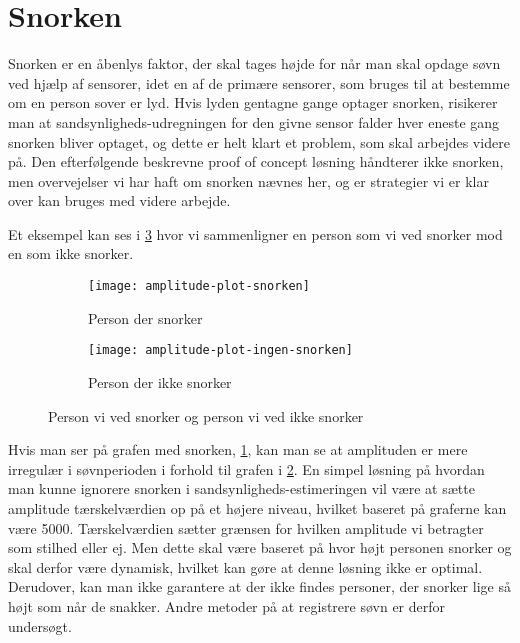 \section{Snorken}\label{section:snorken}
Snorken er en åbenlys faktor, der skal tages højde for når man skal opdage søvn ved hjælp af sensorer, idet en af de primære sensorer, som bruges til at bestemme om en person sover er lyd.
Hvis lyden gentagne gange optager snorken, risikerer man at sandsynligheds-udregningen for den givne sensor falder hver eneste gang snorken bliver optaget, og dette er helt klart et problem, som skal arbejdes videre på.
Den efterfølgende beskrevne proof of concept løsning håndterer ikke snorken, men overvejelser vi har haft om snorken nævnes her, og er strategier vi er klar over kan bruges med videre arbejde.

Et eksempel kan ses i \cref{fig:snorke-vs-ikkesnorken} hvor vi sammenligner en person som vi ved snorker mod en som ikke snorker.

\begin{figure}[h]
\begin{subfigure}{0.49\textwidth}
\texttt{[image: amplitude-plot-snorken]}
\caption{Person der snorker}
\label{fig:person-snorker}
\end{subfigure}
\begin{subfigure}{0.49\textwidth}
\texttt{[image: amplitude-plot-ingen-snorken]}
\caption{Person der ikke snorker}
\label{fig:person-ikke-snorker}
\end{subfigure}
\caption{Person vi ved snorker og person vi ved ikke snorker}
\label{fig:snorke-vs-ikkesnorken}
\end{figure}

Hvis man ser på grafen med snorken, \cref{fig:person-snorker}, kan man se at amplituden er mere irregulær i søvnperioden i forhold til grafen i \cref{fig:person-ikke-snorker}.
En simpel løsning på hvordan man kunne ignorere snorken i sandsynligheds-estimeringen vil være at sætte amplitude tærskelværdien op på et højere niveau, hvilket baseret på graferne kan være 5000. 
Tærskelværdien sætter grænsen for hvilken amplitude vi betragter som stilhed eller ej.
Men dette skal være baseret på hvor højt personen snorker og skal derfor være dynamisk, hvilket kan gøre at denne løsning ikke er optimal. 
Derudover, kan man ikke garantere at der ikke findes personer, der snorker lige så højt som når de snakker.
Andre metoder på at registrere søvn er derfor undersøgt.

